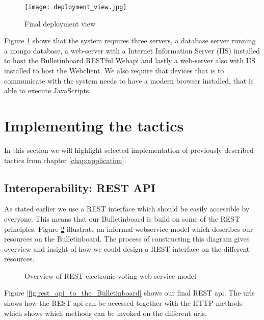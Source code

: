 \begin{figure}[H]
    \centering
    \texttt{[image: deployment\_view.jpg]}
    \caption{Final deployment view}
    \label{fig:final_deployment_view}
\end{figure}

\noindent
Figure \ref{fig:final_deployment_view} shows that the system requires three servers, a database server running a mongo database, a web-server with a Internet Information Server (IIS) installed to host the Bulletinboard RESTful Webapi and lastly a web-server also with IIS installed to host the Webclient. We also require that devices that is to communicate with the system needs to have a modern browser installed, that is able to execute JavaScripts. 


\section{Implementing the tactics}
In this section we will highlight selected implementation of previously described tactics from chapter \ref{chap:application}.

\subsection{Interoperability: REST API}
As stated earlier we use a REST interface which should be easily accessible by everyone. This means that our Bulletinboard is build on some of the REST principles. Figure \ref{fig:rest_electronic_voting_web_service_model} illustrate an informal webservice model which describes our resources on the Bulletinboard. The process of constructing this diagram gives overview and insight of how we could design a REST interface on the different resources. 

\begin{figure}[H]
    \centering
     \caption{Overview of REST electronic voting web service model}
     \label{fig:rest_electronic_voting_web_service_model}
\end{figure}


\noindent
Figure \ref{fig:rest_api_to_the_Bulletinboard} shows our final REST api. The urls shows how the REST api can be accessed together with the HTTP methods which shows which methods can be invoked on the different urls. 


